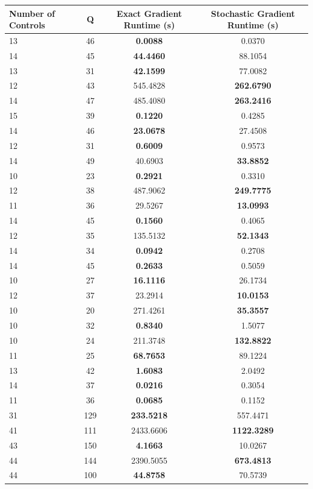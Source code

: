 \documentclass{article}
\begin{document}
\begin{table}[h]
\centering
\begin{tabular}{lccc}
\toprule
Number of Controls & Q & Exact Gradient Runtime (s) & Stochastic Gradient Runtime (s) \\
\midrule
13 & 46 & \textbf{0.0088} & 0.0370 \\
14 & 45 & \textbf{44.4460} & 88.1054 \\
13 & 31 & \textbf{42.1599} & 77.0082 \\
12 & 43 & 545.4828 & \textbf{262.6790} \\
14 & 47 & 485.4080 & \textbf{263.2416} \\
15 & 39 & \textbf{0.1220} & 0.4285 \\
14 & 46 & \textbf{23.0678} & 27.4508 \\
12 & 31 & \textbf{0.6009} & 0.9573 \\
14 & 49 & 40.6903 & \textbf{33.8852} \\
10 & 23 & \textbf{0.2921} & 0.3310 \\
12 & 38 & 487.9062 & \textbf{249.7775} \\
11 & 36 & 29.5267 & \textbf{13.0993} \\
14 & 45 & \textbf{0.1560} & 0.4065 \\
12 & 35 & 135.5132 & \textbf{52.1343} \\
14 & 34 & \textbf{0.0942} & 0.2708 \\
14 & 45 & \textbf{0.2633} & 0.5059 \\
10 & 27 & \textbf{16.1116} & 26.1734 \\
12 & 37 & 23.2914 & \textbf{10.0153} \\
10 & 20 & 271.4261 & \textbf{35.3557} \\
10 & 32 & \textbf{0.8340} & 1.5077 \\
10 & 24 & 211.3748 & \textbf{132.8822} \\
11 & 25 & \textbf{68.7653} & 89.1224 \\
13 & 42 & \textbf{1.6083} & 2.0492 \\
14 & 37 & \textbf{0.0216} & 0.3054 \\
11 & 36 & \textbf{0.0685} & 0.1152 \\
31 & 129 & \textbf{233.5218} & 557.4471 \\
41 & 111 & 2433.6606 & \textbf{1122.3289} \\
43 & 150 & \textbf{4.1663} & 10.0267 \\
44 & 144 & 2390.5055 & \textbf{673.4813} \\
44 & 100 & \textbf{44.8758} & 70.5739 \\

\end{tabular}
\end{table}
\end{document}
